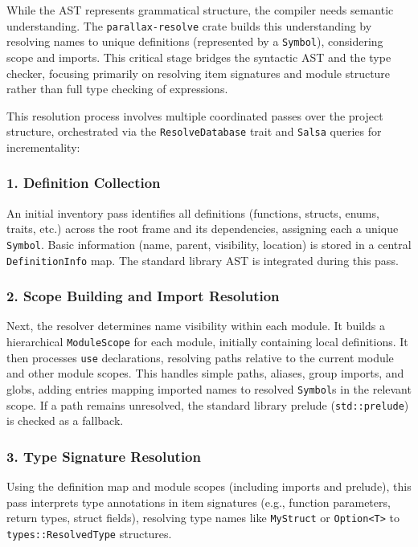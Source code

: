 While the AST represents grammatical structure, the compiler needs semantic understanding. The \texttt{parallax-resolve} crate builds this understanding by resolving names to unique definitions (represented by a \texttt{Symbol}), considering scope and imports. This critical stage bridges the syntactic AST and the type checker, focusing primarily on resolving item signatures and module structure rather than full type checking of expressions.

This resolution process involves multiple coordinated passes over the project structure, orchestrated via the \texttt{ResolveDatabase} trait and \texttt{Salsa} queries for incrementality:

\subsubsection{1. Definition Collection}
An initial inventory pass identifies all definitions (functions, structs, enums, traits, etc.) across the root frame and its dependencies, assigning each a unique \texttt{Symbol}. Basic information (name, parent, visibility, location) is stored in a central \texttt{DefinitionInfo} map. The standard library AST is integrated during this pass.

\subsubsection{2. Scope Building and Import Resolution}
Next, the resolver determines name visibility within each module. It builds a hierarchical \texttt{ModuleScope} for each module, initially containing local definitions. It then processes \texttt{use} declarations, resolving paths relative to the current module and other module scopes. This handles simple paths, aliases, group imports, and globs, adding entries mapping imported names to resolved \texttt{Symbol}s in the relevant scope. If a path remains unresolved, the standard library prelude (\texttt{std::prelude}) is checked as a fallback.

\subsubsection{3. Type Signature Resolution}
Using the definition map and module scopes (including imports and prelude), this pass interprets type annotations in item signatures (e.g., function parameters, return types, struct fields), resolving type names like \texttt{MyStruct} or \texttt{Option<T>} to \texttt{types::ResolvedType} structures.

